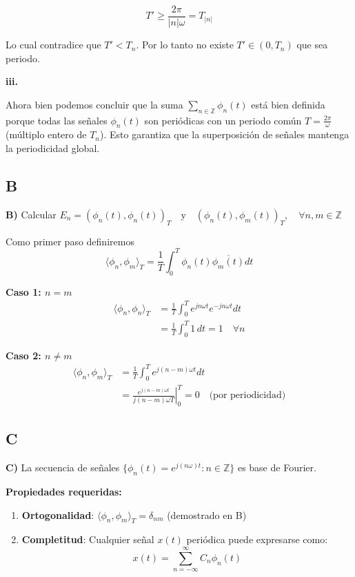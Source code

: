 $$T' \ge \dfrac{2\pi}{|n|\omega} = T_{|n|}$$

Lo cual contradice que $T'<T_n$. Por lo tanto no existe $T'\in(0,T_n)$ que sea periodo.

\textbf{iii.}

Ahora bien podemos concluir que la suma $\sum_{n \in \mathbb{Z}} \phi_n(t)$ está bien definida porque todas las señales $\phi_n(t)$ son periódicas con un periodo común $T = \frac{2\pi}{\omega}$ (múltiplo entero de $T_n$). Esto garantiza que la superposición de señales mantenga la periodicidad global.

\vspace{0.5cm}

\subsection{B}

\textbf{B)} Calcular $E_n = (\phi_n(t), \phi_n(t))_T \quad \text{y} \quad (\phi_n(t), \phi_m(t))_T, \quad \forall n,m \in \mathbb{Z}$

Como primer paso definiremos
\[
\langle \phi_n, \phi_m \rangle_T = \frac{1}{T}\int_0^T \phi_n(t)\overline{\phi_m(t)}dt
\]

\textbf{Caso 1: $n = m$}
\begin{align*}
\langle \phi_n, \phi_n \rangle_T &= \frac{1}{T}\int_0^T e^{jn\omega t}e^{-jn\omega t}dt \\
&= \frac{1}{T}\int_0^T 1\,dt = 1 \quad \forall n
\end{align*}

\textbf{Caso 2: $n \neq m$}
\begin{align*}
\langle \phi_n, \phi_m \rangle_T &= \frac{1}{T}\int_0^T e^{j(n-m)\omega t}dt \\
&= \left.\frac{e^{j(n-m)\omega t}}{j(n-m)\omega T}\right|_0^T = 0 \quad \text{(por periodicidad)}
\end{align*}

\vspace{0.5cm}

\subsection{C}

\textbf{C)} La secuencia de señales $\{ \phi_n(t) = e^{j(n\omega)t} : n \in \mathbb{Z} \}$ es base de Fourier.

\textbf{Propiedades requeridas:}
\begin{enumerate}[label=(\roman*)]
\item \textbf{Ortogonalidad}: $\langle \phi_n, \phi_m \rangle_T = \delta_{nm}$ (demostrado en B)
\item \textbf{Completitud}: Cualquier señal $x(t)$ periódica puede expresarse como:
\[
x(t) = \sum_{n=-\infty}^{\infty} C_n \phi_n(t)
\]
\end{enumerate}

